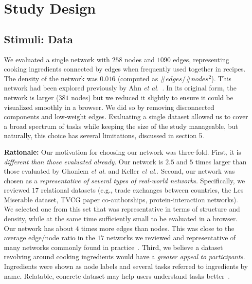 \section{Study Design}

\subsection{Stimuli: Data}

We evaluated a single network with $258$ nodes and $1090$ edges, representing cooking ingredients connected by edges when frequently used together in recipes. The density of the network was $0.016$ (computed as $\#edges/\#nodes^2$). This network had been explored previously by Ahn {\it et al.}~\cite{ahn2011flavor}. In its original form, the network is larger ($381$ nodes) but we reduced it slightly to ensure it could be visualized smoothly in a browser. We did so by removing disconnected components and low-weight edges.  
Evaluating a single dataset allowed us to cover a broad spectrum of tasks while keeping the size of the study manageable, but naturally, this choice has several limitations, discussed in section 5.

\vspace{2mm}
\noindent\textbf{Rationale:} Our motivation for choosing our network was three-fold. First, it is {\it different than those evaluated already}. Our network is $2.5$ and $5$ times larger than those evaluated by Ghoniem {\it et al.} and Keller {\it et al.}. 
Second, our network was chosen as a {\it representative of several types of real-world networks}. Specifically,  we reviewed $17$ relational datasets (e.g.,  trade exchanges between countries,
the Les Miserable dataset, 
TVCG paper co-authorships, 
protein-interaction networks). We selected one from this set that was representative in terms of structure and density, while at the same time sufficiently small to be evaluated in a browser. Our network has about $4$ times more edges than nodes. This was close to the average edge/node ratio in the $17$ networks we reviewed and 
representative of many networks commonly found in practice~\cite{melancon2006just}. 
Third, we believe a dataset revolving around cooking ingredients would have a {\it greater appeal to participants}. Ingredients were shown as node labels and several tasks referred to ingredients by name. Relatable, concrete dataset may help users understand tasks better~\cite{dagstuhl}.


